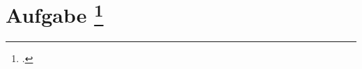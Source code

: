 \documentclass{lehramt-informatik-aufgabe}
\begin{document}
\liAufgabenTitel{}
\section{Aufgabe
\footcite{66116:2020:03}}
\end{document}
